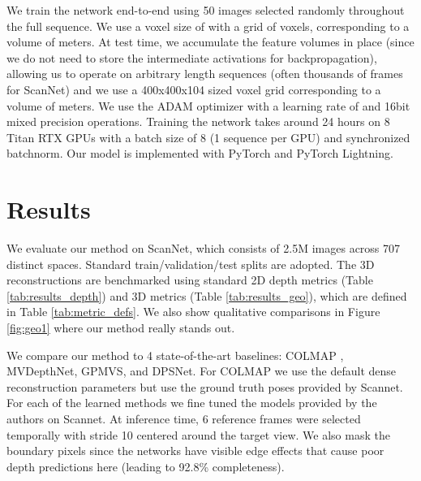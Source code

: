 \documentclass[runningheads]{llncs}
\begin{document}
We train the network end-to-end using 50 images selected randomly throughout the full sequence.
We use a voxel size of  with a grid of  voxels, corresponding to a volume of  meters.
At test time, we accumulate the feature volumes in place (since we do not need to store the intermediate activations for backpropagation), allowing us to operate on arbitrary length sequences (often thousands of frames for ScanNet) and we use a 400x400x104 sized voxel grid corresponding to a volume of  meters. 
We use the ADAM optimizer with a learning rate of  and 16bit mixed precision operations.
Training the network takes around 24 hours on 8 Titan RTX GPUs with a batch size of 8 (1 sequence per GPU) and synchronized batchnorm. Our model is implemented with PyTorch and PyTorch Lightning\cite{falcon2019pytorch}.













\section{Results}

We evaluate our method on ScanNet\cite{dai2017scannet}, which consists of 2.5M images across 707 distinct spaces.
Standard train/validation/test splits are adopted. The 3D reconstructions are benchmarked using standard 2D depth metrics (Table \ref{tab:results_depth}) and 3D metrics (Table \ref{tab:results_geo}), which are defined in Table \ref{tab:metric_defs}. We also show qualitative comparisons in Figure \ref{fig:geo1} where our method really stands out.







We compare our method to 4 state-of-the-art baselines: COLMAP \cite{schoenberger2016mvs, schoenberger2016sfm}, MVDepthNet\cite{wang2018mvdepthnet}, GPMVS\cite{hou2019multi}, and DPSNet\cite{im2019dpsnet}.
For COLMAP we use the default dense reconstruction parameters but use the ground truth poses provided by Scannet.
For each of the learned methods we fine tuned the models provided by the authors on Scannet. At inference time, 6 reference frames were selected temporally with stride 10 centered around the target view. We also mask the boundary pixels since the networks have visible edge effects that cause poor depth predictions here (leading to 92.8\% completeness).
\end{document}
